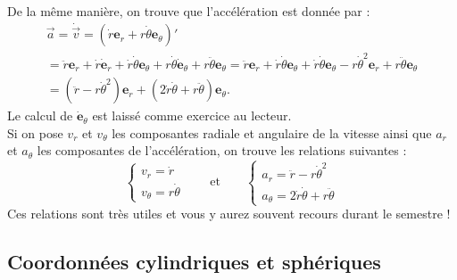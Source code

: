 \documentclass{article}
\begin{document}
\noindent De la même manière, on trouve que l'accélération est donnée par :
\begin{gather*}
    \vec{a} = \dot{\vec{v}} = (\dot{r}\mathbf{e}_r+r\dot \theta\mathbf{e}_\theta)' \\
     =\ddot{r}\mathbf{e}_r + \dot{r}\dot{\mathbf{e}}_r+\dot r \dot \theta\mathbf{e}_\theta + r\dot \theta \dot{\mathbf{e}}_\theta + r \ddot \theta\mathbf{e}_\theta
     = \ddot{r}\mathbf{e}_r + \dot{r}\dot\theta{\mathbf{e}}_\theta+\dot r \dot \theta\mathbf{e}_\theta - r\dot \theta^2\mathbf{e}_r + r \ddot \theta\mathbf{e}_\theta \\
     = (\ddot{r} - r \dot \theta^2)\mathbf{e}_r + (2\dot r \dot \theta + r\ddot \theta) \mathbf{e}_\theta.    
\end{gather*}
Le calcul de $\dot{\mathbf{e}}_\theta$ est laissé comme exercice au lecteur. \\
Si on pose $v_r$ et $v_\theta$ les composantes radiale et angulaire de la vitesse ainsi que $a_r$ et $a_\theta$ les composantes de l'accélération, on trouve les relations suivantes :
\begin{equation*}    
\begin{cases} v_r = \dot r \\
v_\theta = r\dot \theta
\end{cases} \qquad \textrm{et} \qquad 
\begin{cases} a_r = \ddot{r} - r \dot \theta^2 \\
a_\theta = 2\dot r \dot \theta + r\ddot \theta
\end{cases} 
\end{equation*}
Ces relations sont très utiles et vous y aurez souvent recours durant le semestre ! \\

\subsection{Coordonnées cylindriques et sphériques}
\end{document}
